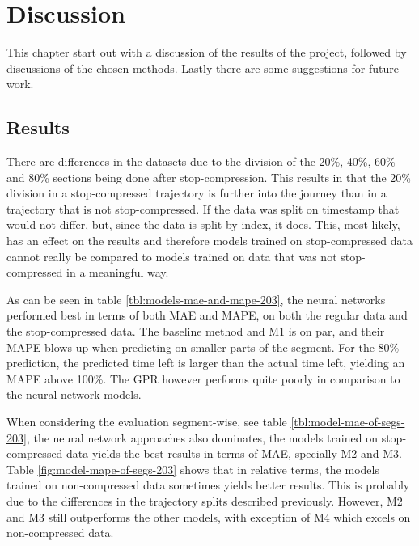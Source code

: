 
\chapter{Discussion}
\label{cha:discussion}

This chapter start out with a discussion of the results of the project, followed by discussions of the chosen methods. Lastly there are some suggestions for future work.

\section{Results}
\label{sec:discussion-results} 
There are differences in the datasets due to the division of the 20\%, 40\%, 60\% and 80\% sections being done after stop-compression. This results in that the 20\% division in a stop-compressed trajectory is further into the journey than in a trajectory that is not stop-compressed. If the data was split on timestamp that would not differ, but, since the data is split by index, it does. This, most likely, has an effect on the results and therefore models trained on stop-compressed data cannot really be compared to models trained on data that was not stop-compressed in a meaningful way.

As can be seen in table \ref{tbl:models-mae-and-mape-203}, the neural networks performed best in terms of both MAE and MAPE, on both the regular data and the stop-compressed data. The baseline method and M1 is on par, and their MAPE blows up when predicting on smaller parts of the segment. For the 80\% prediction, the predicted time left is larger than the actual time left, yielding an MAPE above 100\%. The GPR however performs quite poorly in comparison to the neural network models.

When considering the evaluation segment-wise, see table \ref{tbl:model-mae-of-segs-203}, the neural network approaches also dominates, the models trained on stop-compressed data yields the best results in terms of MAE, specially M2 and M3. Table \ref{fig:model-mape-of-segs-203} shows that in relative terms, the models trained on non-compressed data sometimes yields better results. This is probably due to the differences in the trajectory splits described previously. However, M2 and M3 still outperforms the other models, with exception of M4 which excels on non-compressed data.


